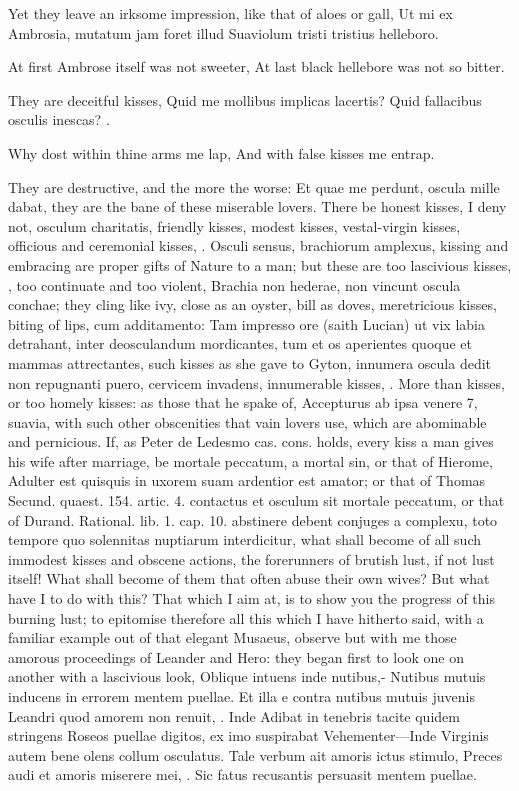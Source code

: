 {Yet they leave an irksome impression, like that of aloes or gall,
Ut mi ex Ambrosia, mutatum jam foret illud
Suaviolum tristi tristius helleboro.

At first Ambrose itself was not sweeter,
At last black hellebore was not so bitter.

They are deceitful kisses,
Quid me mollibus implicas lacertis?
Quid fallacibus osculis inescas? \etc{}.

Why dost within thine arms me lap,
And with false kisses me entrap.

They are destructive, and the more the worse: Et quae me perdunt,
oscula mille dabat, they are the bane of these miserable lovers. There
be honest kisses, I deny not, osculum charitatis, friendly kisses,
modest kisses, vestal-virgin kisses, officious and ceremonial kisses,
\etc{}. Osculi sensus, brachiorum amplexus, kissing and embracing are
proper gifts of Nature to a man; but these are too lascivious kisses,
, \etc{} too continuate
and too violent, Brachia non hederae, non vincunt oscula conchae;
they cling like ivy, close as an oyster, bill as doves, meretricious
kisses, biting of lips, cum additamento: Tam impresso ore (saith
Lucian) ut vix labia detrahant, inter deosculandum mordicantes,
tum et os aperientes quoque et mammas attrectantes, \etc{} such kisses as
she gave to Gyton, innumera oscula dedit non repugnanti puero, cervicem
invadens, innumerable kisses, \etc{}. More than kisses, or too homely
kisses: as those that he spake of, Accepturus ab ipsa venere 7,
suavia, \etc{} with such other obscenities that vain lovers use, which are
abominable and pernicious. If, as Peter de Ledesmo cas. cons. holds,
every kiss a man gives his wife after marriage, be mortale peccatum, a
mortal sin, or that of Hierome, Adulter est quisquis in uxorem
suam ardentior est amator; or that of Thomas Secund. quaest. 154.
artic. 4. contactus et osculum sit mortale peccatum, or that of Durand.
Rational. lib. 1. cap. 10. abstinere debent conjuges a complexu, toto
tempore quo solennitas nuptiarum interdicitur, what shall become of all
such immodest kisses and obscene actions, the forerunners of
brutish lust, if not lust itself! What shall become of them that often
abuse their own wives? But what have I to do with this?
That which I aim at, is to show you the progress of this burning lust;
to epitomise therefore all this which I have hitherto said, with a
familiar example out of that elegant Musaeus, observe but with me those
amorous proceedings of Leander and Hero: they began first to look one
on another with a lascivious look,
Oblique intuens inde nutibus,-
Nutibus mutuis inducens in errorem mentem puellae.
Et illa e contra nutibus mutuis juvenis
Leandri quod amorem non renuit, \etc{}. Inde
Adibat in tenebris tacite quidem stringens
Roseos puellae digitos, ex imo suspirabat
Vehementer---Inde
Virginis autem bene olens collum osculatus.
Tale verbum ait amoris ictus stimulo,
Preces audi et amoris miserere mei,  \etc{}.
Sic fatus recusantis persuasit mentem puellae.


}
